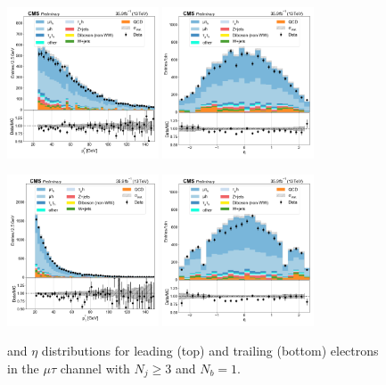 \begin{figure}[htb!]
    \centering
    \includegraphics[width=0.4\textwidth]{chapters/Analysis/sectionPlots/figures/data_mc_overlays/mutau_2016_cat_gt3_eq1_signal_linear_lepton_lepton1_pt}
    \includegraphics[width=0.4\textwidth]{chapters/Analysis/sectionPlots/figures/data_mc_overlays/mutau_2016_cat_gt3_eq1_signal_linear_lepton_lepton1_eta}

    \includegraphics[width=0.4\textwidth]{chapters/Analysis/sectionPlots/figures/data_mc_overlays/mutau_2016_cat_gt3_eq1_signal_linear_lepton_lepton2_pt}
    \includegraphics[width=0.4\textwidth]{chapters/Analysis/sectionPlots/figures/data_mc_overlays/mutau_2016_cat_gt3_eq1_signal_linear_lepton_lepton2_eta}
    \caption{\pt and $\eta$ distributions for leading (top) and trailing
        (bottom) electrons in the $\mu\tau$ channel with $N_{j} \geq 3$ and
        $N_{b} = 1$.}
    \label{fig:analysis:plots:mutau_7_kinematic}
\end{figure}

